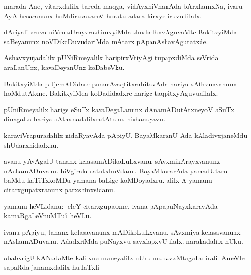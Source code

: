 \begin{mng}
marada Ane, vitarxdalilx bareda maqga, vidAyxhiVnanAda bArxhamxNa, ivaru AyA hesaranunx hoMdiruvavareV horatu adara kirxye iruvudilalx.
\end{mng}

\begin{mng}
dAriyalilxruva niVru sUrayxrashimxyiMda shudadhxvAguvaMte BakitxyiMda saBeyanunx noVDikoDuvudariMda mAtarx pApanAshavAgutatxde.
\end{mng}

\begin{mng}
Ashavxyujadalilx pUNiRmeyalilx haripirxVtiyAgi tupapxdiMda seVrida araLanUnx, kavaDeyanUnx koDabeVku.
\end{mng}

\begin{mng}
BakitxyiMda pUjemADidare punarAvaqtitxrahitavAda hariya sAthxnavanunx hoMdutAtxne. BakitxyiMda koDadidadxre harige taqpitxyAguvudilalx.
\end{mng}

\begin{mng}
pUniRmeyalilx harige eSuTx kavaDegaLanunx dAnamADutAtxneyoV aSuTx dinagaLu hariya sAthxnadalilxrutAtxne. nishacxyavu.
\end{mng}

\begin{mng}
karaviVrapuradalilx nidaRyavAda pApiyU, BayaMkaranU Ada kAladivxjaneMdu shUdarxnidadxnu.
\end{mng}

\begin{mng}
avanu yAvAgalU tananx kelasamADikoLuLxvanu. sAvxmikArayxvanunx nAshamADuvanu. hiVgiralu satutxhoVdanu. BayaMkararAda yamadUtaru baMdu kaTiTxkoMDu yamana baLige koMDoyadxru. alilx A yamanu citarxgupatxranunx parxshinxsidanu.
\end{mng}

\begin{mng}
yamanu heVLidanu:- eleY citarxgupatxne, ivana pApapuNayxkaravAda kamaRgaLeVnuMTu? heVLu.
\end{mng}

\begin{mng}
ivanu pApiyu, tananx kelasavanunx mADikoLuLxvanu. sAvxmiya kelasavanunx nAshamADuvanu. AdadxriMda puNayxvu savxlapxvU ilalx. narakadalilx nUku.
\end{mng}

\begin{mng}
obabxrigU kANadaMte kalilxna maneyalilx nUru manavxMtagaLu irali. AmeVle sapaRda janamxdalilx huTaTxli.
\end{mng}

